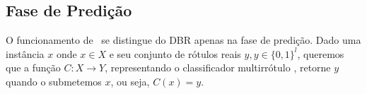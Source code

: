 %  
%  

 


 
 \subsection{Fase de Predição}
 O funcionamento de \MRLMa~se distingue do DBR apenas na fase de predição.
 Dado uma instância $x$ onde $x\in X$ e seu conjunto de rótulos reais $y,y \in {\{0,1\}}^l$, queremos que a função $C:X\rightarrow Y$,
 representando o classificador multirrótulo \MRLMa, retorne $y$ quando o submetemos $x$, ou seja, $C(x)=y$.
 
